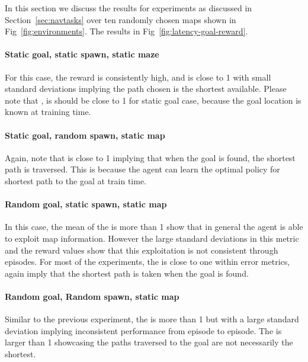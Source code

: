 
In this section we discuss the results for experiments as discussed in Section~\ref{sec:navtasks} over ten randomly chosen maps shown in Fig~\ref{fig:environments}. The results in Fig~\ref{fig:latency-goal-reward}.
\paragraph{Static goal, static spawn, static maze}
For this case, the reward is consistently high, and \DistanceInefficiency{} is close to 1 with small standard deviations implying the path chosen is the shortest available.
Please note that \LatencyOneGtOne{}, is should be close to 1 for static goal case, because the goal location is known at training time.

\paragraph{Static goal, random spawn, static map}
Again, note that \DistanceInefficiency{} is close to 1 implying that when the goal is found, the shortest path is traversed.
This is because the agent can learn the optimal  policy for shortest path to the goal at train time.

\paragraph{Random goal, static spawn, static map}
In this case, the mean of the \LatencyOneGtOne{} is more than 1 show that in general the agent is able to exploit map information.
However the large standard deviations in this metric and the reward values show that this exploitation is not consistent through episodes.
For most of the experiments, the \DistanceInefficiency{} is close to one within error metrics, again imply that the shortest path is taken when the goal is found. 

\paragraph{Random goal, Random spawn, static map}
Similar to the previous experiment, the \LatencyOneGtOne{} is more than 1 but with a large standard deviation implying inconsistent performance from episode to episode.
The \DistanceInefficiency{} is larger than 1 showcasing the paths traversed to the goal are not necessarily the shortest.

